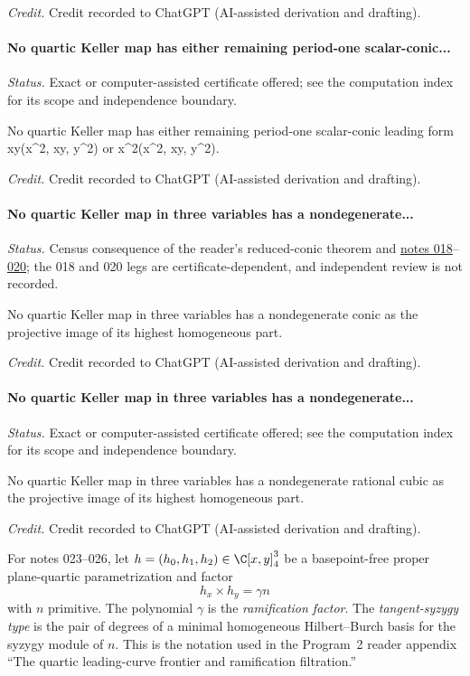 \emph{Credit.} Credit recorded to ChatGPT (AI-assisted derivation and drafting).

\label{supp-note-02-020}
\paragraph{No quartic Keller map has either remaining period-one scalar-conic...}
\emph{Status.} Exact or computer-assisted certificate offered; see the computation index for its scope and independence boundary.

No quartic Keller map has either remaining period-one scalar-conic leading form xy(x\textasciicircum{}2, xy, y\textasciicircum{}2) or x\textasciicircum{}2(x\textasciicircum{}2, xy, y\textasciicircum{}2).

\emph{Credit.} Credit recorded to ChatGPT (AI-assisted derivation and drafting).

\label{supp-note-02-021}
\paragraph{No quartic Keller map in three variables has a nondegenerate...}
\emph{Status.} Census consequence of the reader's reduced-conic theorem and
\hyperref[supp-note-02-018]{notes 018}--
\hyperref[supp-note-02-020]{020}; the 018 and 020 legs are
certificate-dependent, and independent review is not recorded.

No quartic Keller map in three variables has a nondegenerate conic as the projective image of its highest homogeneous part.

\emph{Credit.} Credit recorded to ChatGPT (AI-assisted derivation and drafting).

\label{supp-note-02-022}
\paragraph{No quartic Keller map in three variables has a nondegenerate...}
\emph{Status.} Exact or computer-assisted certificate offered; see the computation index for its scope and independence boundary.

No quartic Keller map in three variables has a nondegenerate rational cubic as the projective image of its highest homogeneous part.

\emph{Credit.} Credit recorded to ChatGPT (AI-assisted derivation and drafting).

\noindent
For notes 023--026, let
\(h=(h_0,h_1,h_2)\in\C[x,y]_4^3\) be a basepoint-free proper plane-quartic
parametrization and factor
\[
h_x\times h_y=\gamma n
\]
with \(n\) primitive.  The polynomial \(\gamma\) is the
\emph{ramification factor}.  The \emph{tangent-syzygy type} is the pair of
degrees of a minimal homogeneous Hilbert--Burch basis for the syzygy module
of \(n\).  This is the notation used in the Program~2 reader appendix
``The quartic leading-curve frontier and ramification filtration.''

